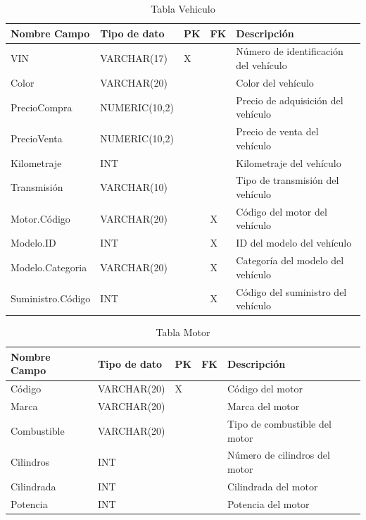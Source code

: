 \documentclass[12pt]{article}
\begin{document}
\begin{table}[htbp]
    \begin{center}
        \begin{tabular}{|p{3cm}|p{3cm}|p{1cm}|p{1cm}|p{6cm}|}
            \hline
            Nombre Campo & Tipo de dato & PK & FK & Descripción \\
            \hline
            VIN & VARCHAR(17) & X &  & Número de identificación del vehículo \\
            Color & VARCHAR(20) &  &  & Color del vehículo \\
            PrecioCompra & NUMERIC(10,2) &  &  & Precio de adquisición del vehículo \\
            PrecioVenta & NUMERIC(10,2) &  &  & Precio de venta del vehículo \\
            Kilometraje & INT &  &  & Kilometraje del vehículo \\
            Transmisión & VARCHAR(10) &  &  & Tipo de transmisión del vehículo \\
            Motor.Código & VARCHAR(20) &  & X & Código del motor del vehículo \\
            Modelo.ID & INT &  & X & ID del modelo del vehículo \\
            Modelo.Categoria & VARCHAR(20) &  & X & Categoría del modelo del vehículo \\
            Suministro.Código & INT &  & X & Código del suministro del vehículo \\
            \hline
            \end{tabular}
        \caption{Tabla Vehiculo}
    \end{center}
\end{table}


\begin{table}[htbp]
    \begin{center}
        \begin{tabular}{|p{3cm}|p{3cm}|p{1cm}|p{1cm}|p{6cm}|}
            \hline
            Nombre Campo & Tipo de dato & PK & FK & Descripción \\
            \hline
            Código & VARCHAR(20) & X &  & Código del motor \\
            Marca & VARCHAR(20) &  &  & Marca del motor \\
            Combustible & VARCHAR(20) &  &  & Tipo de combustible del motor \\
            Cilindros & INT &  &  & Número de cilindros del motor \\
            Cilindrada & INT &  &  & Cilindrada del motor \\
            Potencia & INT &  &  & Potencia del motor \\
            \hline
            \end{tabular}
        \caption{Tabla Motor}
    \end{center}
\end{table}
\end{document}
